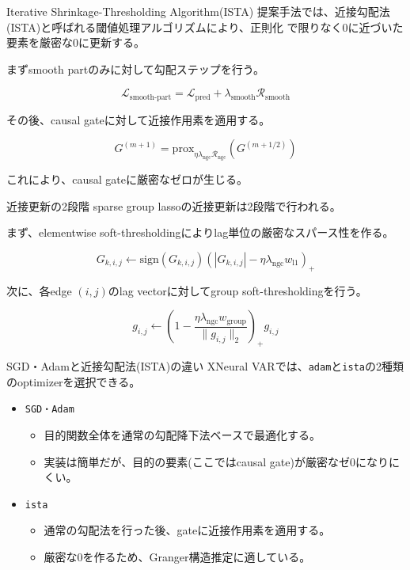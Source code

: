 \documentclass[dvipdfmx,11pt]{beamer}
\begin{document}
\begin{frame}{Iterative Shrinkage-Thresholding Algorithm(ISTA)}
  提案手法では、近接勾配法(ISTA)と呼ばれる閾値処理アルゴリズムにより、正則化
  で限りなく0に近づいた要素を厳密な0に更新する。

  まずsmooth partのみに対して勾配ステップを行う。

  \[
    \mathcal{L}_{\mathrm{smooth\text{-}part}}
    =
    \mathcal{L}_{\mathrm{pred}}
    +
    \lambda_{\mathrm{smooth}}
    \mathcal{R}_{\mathrm{smooth}}
  \]

  その後、causal gateに対して近接作用素を適用する。

  \[
    G^{(m+1)}
    =
    \mathrm{prox}_{
      \eta \lambda_{\mathrm{ngc}}
      \mathcal{R}_{\mathrm{ngc}}
    }
    \left(
      G^{(m+1/2)}
    \right)
  \]

  これにより、causal gateに厳密なゼロが生じる。
\end{frame}

\begin{frame}{近接更新の2段階}
  sparse group lassoの近接更新は2段階で行われる。

  \vspace{0.5em}
  まず、elementwise soft-thresholdingによりlag単位の厳密なスパース性を作る。

  \[
    G_{k,i,j}
    \leftarrow
    \mathrm{sign}(G_{k,i,j})
    \left(
      |G_{k,i,j}|
      -
      \eta \lambda_{\mathrm{ngc}} w_{\mathrm{l1}}
    \right)_+
  \]

  次に、各edge $(i,j)$のlag vectorに対してgroup soft-thresholdingを行う。

  \[
    g_{i,j}
    \leftarrow
    \left(
      1 -
      \frac{
        \eta \lambda_{\mathrm{ngc}} w_{\mathrm{group}}
      }{
        \|g_{i,j}\|_2
      }
    \right)_+
    g_{i,j}
  \]
\end{frame}

\begin{frame}{SGD・Adamと近接勾配法(ISTA)の違い}
  XNeural VARでは、\texttt{adam}と\texttt{ista}の2種類のoptimizerを選択できる。

  \begin{itemize}
    \item \texttt{SGD・Adam}
      \begin{itemize}
        \item 目的関数全体を通常の勾配降下法ベースで最適化する。
        \item 実装は簡単だが、目的の要素(ここではcausal gate)が厳密なゼ0になりにくい。
      \end{itemize}

    \item \texttt{ista}
      \begin{itemize}
        \item 通常の勾配法を行った後、gateに近接作用素を適用する。
        \item 厳密な0を作るため、Granger構造推定に適している。
      \end{itemize}
  \end{itemize}
\end{frame}
\end{document}
